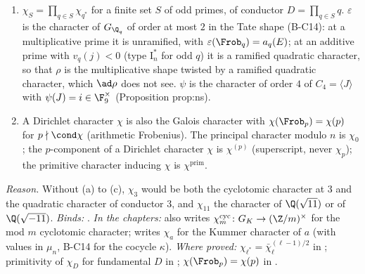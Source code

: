 \begin{convention}[B-C6: characters]
\begin{enumerate}[label=(\alph*)]
\item $\chi_S=\prod_{q\in S}\chi_{q^*}$ for a finite set $S$ of odd primes, of conductor $D=\prod_{q\in S}q$. $\varepsilon$ is the character of
$G_{\Q_q}$ of order at most $2$ in the Tate shape (B-C14): at a multiplicative prime it is unramified, with $\varepsilon(\Frob_q)=a_q(E)$; at an
additive prime with $v_q(j)<0$ (type $\mathrm I_n^*$ for odd $q$) it is a ramified quadratic character, so that $\rho$ is the multiplicative shape
twisted by a ramified quadratic character, which $\ad\rho$ does not see.
$\psi$ is the character of order $4$ of $C_4=\langle J\rangle$ with $\psi(J)=i\in\F_9^\times$ (Proposition prop:ns).
\item A Dirichlet character $\chi$ is also the Galois character with $\chi(\Frob_p)=\chi(p)$ for $p\nmid\cond\chi$ (arithmetic Frobenius).
The principal character modulo $n$ is $\chi_0$; the $p$-component of a Dirichlet character $\chi$ is $\chi^{(p)}$ (superscript, never
$\chi_p$); the primitive character inducing $\chi$ is $\chi^{\mathrm{prim}}$.
\end{enumerate}
\end{convention}

\noindent\emph{Reason.} Without (a) to (c), $\chi_3$ would be both the cyclotomic character at $3$ and the quadratic character of
conductor $3$, and $\chi_{11}$ the character of $\Q(\sqrt{11})$ or of $\Q(\sqrt{-11})$. \emph{Binds:}
.
\emph{In the chapters:}  also writes $\chi_m^{\mathrm{cyc}}\colon G_K\to(\Z/m)^\times$ for the mod $m$ cyclotomic
character;  writes $\chi_a$ for the Kummer character of $a$ (with values in $\mu_n$, B-C14 for the cocycle
$\kappa$). \emph{Where proved:} $\chi_{\ell^*}=\bar\chi_\ell^{(\ell-1)/2}$ in ; primitivity of $\chi_D$ for fundamental $D$ in
; $\chi(\Frob_p)=\chi(p)$ in .

